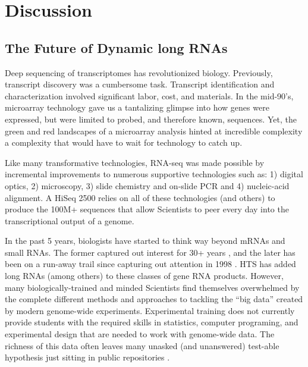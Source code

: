 \chapter{Discussion}   \label{Chapter 5} 

\section{The Future of Dynamic long RNAs}

    Deep sequencing of transcriptomes has revolutionized biology. Previously, transcript discovery was a cumbersome task. Transcript identification and characterization involved significant labor, cost, and materials. In the mid-90's, microarray technology \citep{Schena1995a} gave us a tantalizing glimpse into how genes were expressed, but were limited to probed, and therefore known, sequences. Yet, the green and red landscapes of a microarray analysis hinted at incredible complexity \textemdash a complexity that would have to wait for technology to catch up.

    Like many transformative technologies, RNA-seq was made possible by incremental improvements to numerous supportive technologies such as: 1) digital optics, 2) microscopy, 3) slide chemistry and on-slide PCR and 4) nucleic-acid alignment. A HiSeq 2500 relies on all of these technologies (and others) to produce the 100M+ sequences that allow Scientists to peer every day into the transcriptional output of a genome.

    In the past 5 years, biologists have started to think way beyond mRNAs and small RNAs. The former captured out interest for 30+ years \citep{Furuichi1975,Wei1975}, and the later has been on a run-away trail since capturing out attention in 1998 \citep{Fire1998}. HTS has added long RNAs (among others) to these classes of gene RNA products. However, many biologically-trained and minded Scientists find themselves overwhelmed by the complete different methods and approaches to tackling the ``big data'' created by modern genome-wide experiments. Experimental training does not currently provide students with the required skills in statistics, computer programing, and experimental design that are needed to work with genome-wide data. The richness of this data often leaves many unasked (and unanswered) test-able hypothesis just sitting in public repositories \citep{Plocik2013}.

